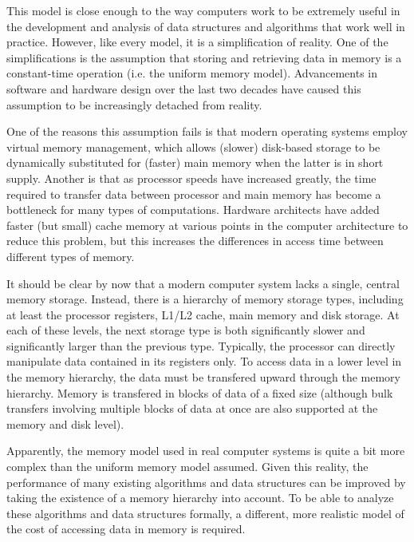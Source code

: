 \documentclass{acm_proc_article-sp}
\begin{document}
This model is close enough to the way computers work to be extremely useful in the development and analysis of data structures and algorithms that work well in practice. However, like every model, it is a simplification of reality. One of the simplifications is the assumption that storing and retrieving data in memory is a constant-time operation (i.e. the uniform memory model). Advancements in software and hardware design over the last two decades have caused this assumption to be increasingly detached from reality.

One of the reasons this assumption fails is that modern operating systems employ virtual memory management, which allows (slower) disk-based storage to be dynamically substituted for (faster) main memory when the latter is in short supply. Another is that as processor speeds have increased greatly, the time required to transfer data between processor and main memory has become a bottleneck for many types of computations. Hardware architects have added faster (but small) cache memory at various points in the computer architecture to reduce this problem, but this increases the differences in access time between different types of memory.

It should be clear by now that a modern computer system lacks a single, central memory storage. Instead, there is a hierarchy of memory storage types, including at least the processor registers, L1/L2 cache, main memory and disk storage. At each of these levels, the next storage type is both significantly slower and significantly larger than the previous type. Typically, the processor can directly manipulate data contained in its registers only. To access data in a lower level in the memory hierarchy, the data must be transfered upward through the memory hierarchy. Memory is transfered in blocks of data of a fixed size (although bulk transfers involving multiple blocks of data at once are also supported at the memory and disk level).


Apparently, the memory model used in real computer systems is quite a bit more complex than the uniform memory model assumed. Given this reality, the performance of many existing algorithms and data structures can be improved by taking the existence of a memory hierarchy into account. To be able to analyze these algorithms and data structures formally, a different, more realistic model of the cost of accessing data in memory is required.
\end{document}
